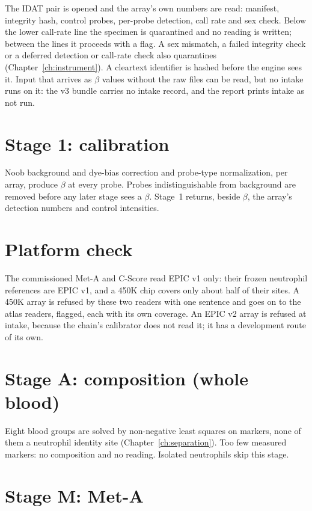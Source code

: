 The IDAT pair is opened and the array's own numbers are read: manifest, integrity hash, control probes, per-probe detection, call rate and sex check.
Below the lower call-rate line the specimen is quarantined and no reading is written; between the lines it proceeds with a flag. A sex mismatch, a failed
integrity check or a deferred detection or call-rate check also quarantines (Chapter~\ref{ch:instrument}). A cleartext identifier is hashed before the
engine sees it. Input that arrives as $\beta$ values without the raw files can be read, but no intake runs on it: the v3 bundle carries no intake record,
and the report prints intake as not run.

\section{Stage 1: calibration}

Noob background and dye-bias correction and probe-type normalization, per array, produce $\beta$ at every probe. Probes indistinguishable from background are
removed before any later stage sees a $\beta$. Stage~1 returns, beside $\beta$, the array's detection numbers and control intensities.

\section{Platform check}

The commissioned Met-A and C-Score read EPIC v1 only: their frozen neutrophil references are EPIC v1, and a 450K chip covers only about half of their
sites. A 450K array is refused by these two readers with one sentence and goes on to the atlas readers, flagged, each with its own coverage.
An EPIC v2 array is refused at intake, because the chain's calibrator does not read it; it has a development route of its own.

\section{Stage A: composition (whole blood)}

Eight blood groups are solved by non-negative least squares on markers, none of them a neutrophil identity site (Chapter~\ref{ch:separation}). Too few
measured markers: no composition and no reading. Isolated neutrophils skip this stage.

\section{Stage M: Met-A}

